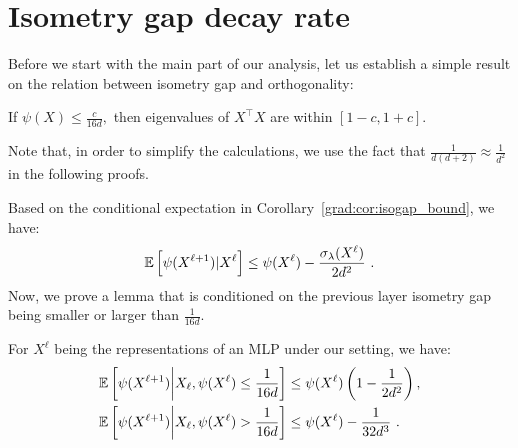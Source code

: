 \section{Isometry gap decay rate}
\label{grad:sec:proof_isometry_depth}
Before we start with the main part of our analysis, let us establish a simple result on the relation between isometry gap and orthogonality: 
\begin{lemma}\label{grad:lem:isogap_ortho}
    If $\psi(X)\le \frac{c}{16d},$ then eigenvalues of $X^\top X$ are within $[1-c, 1+c].$
\end{lemma}

Note that, in order to simplify the calculations, we use the fact that $\frac{1}{d(d+2)} \approx \frac{1}{d^2}$ in the following proofs.

Based on the conditional expectation in Corollary~\ref{grad:cor:isogap_bound}, we have:
\begin{align}
    \mathbb{E} \left[\psi(X^{\ell+1}) | X^\ell \right] \le \psi(X^\ell) - \frac{\sigma_\lambda(X^\ell)}{2d^2}~.
\end{align}
Now, we prove a lemma that is conditioned on the previous layer isometry gap being smaller or larger than $\frac{1}{16d}$.
\begin{lemma}
\label{grad:lem:iso_gap_step_conditional}
    For $X^\ell$ being the representations of an MLP under our setting, we have:
    \begin{align}
    \mathbb{E} \left[\psi(X^{\ell+1}) \middle| X_\ell, \psi(X^\ell) \le \frac{1}{16d}\right] &\le \psi(X^\ell)\left(1-\frac{1}{2d^2}\right), \label{grad:eqn:ineq1} \\
    \mathbb{E} \left[\psi(X^{\ell+1}) \middle| X_\ell, \psi(X^\ell) > \frac{1}{16d}\right] &\le \psi(X^\ell) - \frac{1}{32d^3}~. \label{grad:eqn:ineq2}
    \end{align}
\end{lemma}

